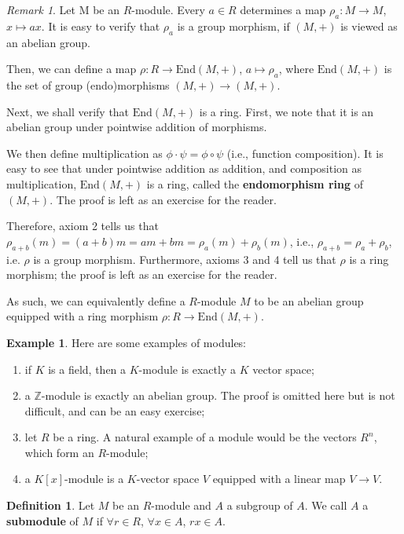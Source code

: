\documentclass[12pt, a4paper, titlepage]{report}
\theoremstyle{plain} %
\theoremstyle{definition}
\newtheorem{defn}{Definition}[section]
\newtheorem{exmp}{Example}[section]
\theoremstyle{remark}
\newtheorem*{rem}{Remark}
\newcommand{\Endo}[1]{\ensuremath{\mathrm{End}(#1)}}
\begin{document}
\begin{rem}
  Let M be an $R$-module. Every $a \in R$ determines a map $\rho_a : M \rightarrow M$, $x \mapsto ax$. It is easy to verify that
  $\rho_a$ is a group morphism, if $(M, +)$ is viewed as an abelian group.

  Then, we can define a map $\rho : R \rightarrow \Endo{M, +}$, $a \mapsto \rho_a$, where $\Endo{M, +}$ is the set of
  group (endo)morphisms $(M, +) \rightarrow (M, +)$.

  Next, we shall verify that $\Endo{M, +}$ is a ring. First, we note that it is an abelian group under pointwise addition of
  morphisms.

  We then define multiplication as $\phi \cdot \psi = \phi \circ \psi$ (i.e., function composition). It is easy to see that under
  pointwise addition as addition, and composition as multiplication, $\Endo{M, +}$ is a ring, called the \textbf{endomorphism ring}
  of $(M, +)$. The proof is left as an exercise for the reader.

  Therefore, axiom 2 tells us that $\rho_{a + b}(m) = (a+b)m = am + bm = \rho_a(m) + \rho_b(m)$, i.e., $\rho_{a + b} = \rho_a + \rho_b$, i.e.
  $\rho$ is a group morphism. Furthermore, axioms 3 and 4 tell us that $\rho$ is a ring morphism; the proof is left as an exercise
  for the reader.

  As such, we can equivalently define a $R$-module $M$ to be an abelian group equipped with a ring morphism
  $\rho : R \rightarrow \Endo{M, +}$.
\end{rem}

\begin{exmp}
  Here are some examples of modules:
  \begin{enumerate}
  \item if $K$ is a field, then a $K$-module is exactly a $K$ vector space;
  \item a $\mathbb{Z}$-module is exactly an abelian group. The proof is omitted here but is not difficult, and
    can be an easy exercise;
  \item let $R$ be a ring. A natural example of a module would be the vectors $R^n$, which form an $R$-module;
  \item a $K[x]$-module is a $K$-vector space $V$ equipped with a linear map $V \rightarrow V$.
  \end{enumerate}
\end{exmp}

\begin{defn}
  Let $M$ be an $R$-module and $A$ a subgroup of $A$. We call $A$ a \textbf{submodule} of $M$ if
  $\forall r \in R$, $\forall x \in A$, $rx \in A$.
\end{defn}
\end{document}
